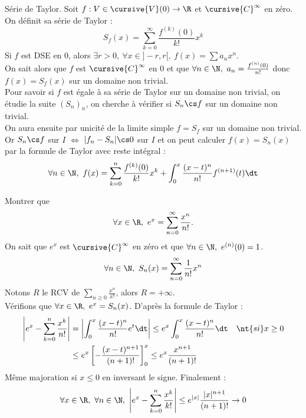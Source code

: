 \documentclass[11pt]{article}
\begin{document}
\begin{defi}{Série de Taylor.}{}
    Soit $f:V\in\cursive{V}(0)\to\R$ et $\cursive{C}^\infty$ en zéro. On définit sa série de Taylor :
    \begin{equation*}
        S_f(x) = \sum_{k=0}^{\infty}\frac{f^{(k)}(0)}{k!}x^k
    \end{equation*}
    \tcblower
    Si $f$ est DSE en 0, alors $\exists r > 0, ~ \forall x \in ]-r,r[, ~ f(x)=\sum a_nx^n$.\\
    On sait alors que $f$ est $\cursive{C}^\infty$ en 0 et que $\forall n \in\N, ~ a_n = \frac{f^{(n)}(0)}{n!}$ donc $f(x)=S_f(x)$ sur un domaine non trivial.\\
    Pour savoir si $f$ est égale à sa série de Taylor sur un domaine non trivial, on étudie la suite $(S_n)_n$, on cherche à vérifier si $S_n\cs f$ sur un domaine non trivial.\\
    On aura ensuite par unicité de la limite simple $f=S_f$ sur un domaine non trivial.\\
    Or $S_n \cs f$ sur $I$ $\iff$ $|f_n-S_n|\cs 0$ sur $I$ et on peut calculer $f(x)=S_n(x)$ par la formule de Taylor avec reste intégral :
    \begin{equation*}
        \forall n \in \N, ~ f(x) = \sum_{k=0}^n\frac{f^{(k)}(0)}{k!}x^k + \int_0^x \frac{(x-t)^n}{n!}f^{(n+1)}(t)\dt
    \end{equation*}
\end{defi}

\begin{app}{}{}
    Montrer que
    \begin{equation*}
        \forall x \in \R, ~ e^x = \sum_{n=0}^\infty\frac{x^n}{n!}. 
    \end{equation*}
    On sait que $e^x$ est $\cursive{C}^\infty$ en zéro et que $\forall n \in \N, ~ e^{(n)}(0)=1$.
    \begin{equation*}
        \forall n \in \N, ~ S_n(x)=\sum_{n=0}^\infty\frac{1}{n!}x^n
    \end{equation*}
    Notons $R$ le RCV de $\sum_{n\geq0}\frac{x^n}{x!}$, alors $R=+\infty$.\\
    Vérifions que $\forall x \in \R, ~ e^x = S_n(x)$. D'après la formule de Taylor :
    \begin{align*}
       \left| e^x - \sum_{k=0}^n\frac{x^k}{n!} \right| &= \left|\int_0^x\frac{(x-t)^n}{n!}e^{t}\dt\right| \leq e^x\int_0^x\frac{(x-t)^n}{n!}\dt \quad \nt{si } x\geq0\\
       &\leq e^x\left[ -\frac{(x-t)^{n+1}}{(n+1)!} \right]_0^x \leq e^x\frac{x^{n+1}}{(n+1)!}
    \end{align*} 
    Même majoration si $x\leq 0$ en inversant le signe. Finalement :
    \begin{equation*}
        \forall x \in \R, ~ \forall n \in \N, ~ \left|e^x-\sum_{k=0}^n\frac{x^k}{k!}\right|\leq e^{|x|}\frac{|x|^{n+1}}{(n+1)!}\to 0
    \end{equation*}
\end{app}
\end{document}
